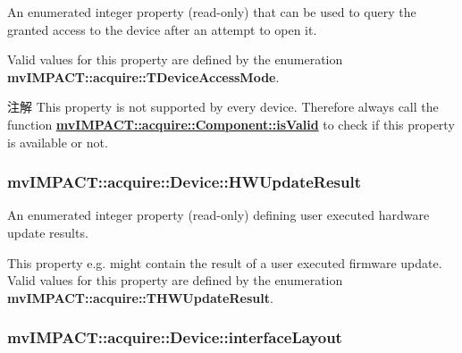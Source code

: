 An enumerated integer property {\bfseries }(read-\/only) that can be used to query the granted access to the device after an attempt to open it. 

Valid values for this property are defined by the enumeration {\bfseries mv\+I\+M\+P\+A\+C\+T\+::acquire\+::\+T\+Device\+Access\+Mode}.

\begin{DoxyNote}{注解}
This property is not supported by every device. Therefore always call the function {\bfseries \hyperlink{classmv_i_m_p_a_c_t_1_1acquire_1_1_component_ac51e55e7e046101f3c6119d84123abd5}{mv\+I\+M\+P\+A\+C\+T\+::acquire\+::\+Component\+::is\+Valid}} to check if this property is available or not. 
\end{DoxyNote}
\hypertarget{classmv_i_m_p_a_c_t_1_1acquire_1_1_device_a8e6d960358632d3e55f2f20474a3aa26}{
\subsubsection[{H\+W\+Update\+Result}]{ mv\+I\+M\+P\+A\+C\+T\+::acquire\+::\+Device\+::\+H\+W\+Update\+Result}}\label{classmv_i_m_p_a_c_t_1_1acquire_1_1_device_a8e6d960358632d3e55f2f20474a3aa26}


An enumerated integer property {\bfseries }(read-\/only) defining user executed hardware update results. 

This property e.\+g. might contain the result of a user executed firmware update. Valid values for this property are defined by the enumeration {\bfseries mv\+I\+M\+P\+A\+C\+T\+::acquire\+::\+T\+H\+W\+Update\+Result}. \hypertarget{classmv_i_m_p_a_c_t_1_1acquire_1_1_device_ab4dd0ecc9d456bb5ddc01d844c9d6f2d}{
\subsubsection[{interface\+Layout}]{ mv\+I\+M\+P\+A\+C\+T\+::acquire\+::\+Device\+::interface\+Layout}}\label{classmv_i_m_p_a_c_t_1_1acquire_1_1_device_ab4dd0ecc9d456bb5ddc01d844c9d6f2d}


